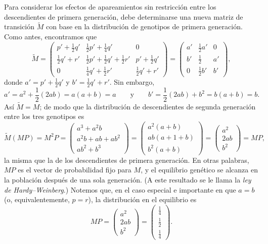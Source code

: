 \documentclass[12pt,a4paper]{book}
\begin{document}
    Para considerar los efectos de apareamientos sin restricción entre los descendientes de primera generación, debe determinarse una nueva matriz de transición $\widetilde M$ con base en la distribución de genotipos de primera generación. Como antes, encontramos que
    \begin{equation*}
        \widetilde M=\begin{pmatrix}
            p'+\frac12q' & \frac12p'+\frac14q' & 0\\
            \frac12q'+r' & \frac12p'+\frac12q'+\frac12r' & p'+\frac12q'\\
            0 & \frac14q'+\frac12r' & \frac12q'+r'
        \end{pmatrix}=\begin{pmatrix}a'&\frac12a'&0\\b'&\frac12&a'\\0&\frac12b'&b'\end{pmatrix},
    \end{equation*}
    donde $a'=p'+\frac12q'$ y $b'=\frac12q'+r'$. Sin embargo,
    \begin{equation*}
        a'=a^2+\frac12(2ab)=a(a+b)=a \qquad\text{y}\qquad b'=\frac12(2ab)+b^2=b(a+b)=b.
    \end{equation*}
    Así $\widetilde M=M$; de modo que la distribución de descendientes de segunda generación entre los tres genotipos es
    \begin{equation*}
        \widetilde M(MP)=M^2P=\begin{pmatrix}a^3+a^2b\\a^2b+ab+ab^2\\ab^2+b^3\end{pmatrix}=\begin{pmatrix}a^2(a+b)\\ab(a+1+b)\\b^2(a+b)\end{pmatrix}=\begin{pmatrix}a^2\\2ab\\b^2\end{pmatrix}=MP,
    \end{equation*}
    la misma que la de los descendientes de primera generación. En otras palabras, $MP$ es el vector de probabilidad fijo para $M$, y el equilibrio genético se alcanza en la población después de una sola generación. (A este resultado se le llama la \textit{ley de Hardy--Weinberg}.) Notemos que, en el caso especial e importante en que $a=b$ (o, equivalentemente, $p=r$), la distribución en el equilibrio es
    \begin{equation*}
        MP=\begin{pmatrix}a^2\\2ab\\b^2\end{pmatrix}=\begin{pmatrix}\frac14\\\frac12\\\frac14\end{pmatrix}.
    \end{equation*}
\end{document}

